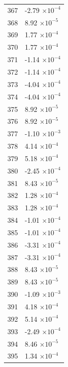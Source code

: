 \documentclass[a4paper,11pt]{article}
\begin{document}
\begin{center}
\begin{longtable}{|R{1.5cm}|R{2.5cm}|}
  367 &        -2.79 $\times 10^{          -4}$ \\
  368 &         8.92 $\times 10^{          -5}$ \\
  369 &         1.77 $\times 10^{          -4}$ \\
  370 &         1.77 $\times 10^{          -4}$ \\
  371 &        -1.14 $\times 10^{          -4}$ \\
  372 &        -1.14 $\times 10^{          -4}$ \\
  373 &        -4.04 $\times 10^{          -4}$ \\
  374 &        -4.04 $\times 10^{          -4}$ \\
  375 &         8.92 $\times 10^{          -5}$ \\
  376 &         8.92 $\times 10^{          -5}$ \\
 {\color{red} 377} & {\color{red}       -1.10 $\times 10^{          -3}$} \\
  378 &         4.14 $\times 10^{          -4}$ \\
  379 &         5.18 $\times 10^{          -4}$ \\
  380 &        -2.45 $\times 10^{          -4}$ \\
  381 &         8.43 $\times 10^{          -5}$ \\
  382 &         1.28 $\times 10^{          -4}$ \\
  383 &         1.28 $\times 10^{          -4}$ \\
  384 &        -1.01 $\times 10^{          -4}$ \\
  385 &        -1.01 $\times 10^{          -4}$ \\
  386 &        -3.31 $\times 10^{          -4}$ \\
  387 &        -3.31 $\times 10^{          -4}$ \\
  388 &         8.43 $\times 10^{          -5}$ \\
  389 &         8.43 $\times 10^{          -5}$ \\
  390 &        -1.09 $\times 10^{          -3}$ \\
  391 &         4.18 $\times 10^{          -4}$ \\
  392 &         5.14 $\times 10^{          -4}$ \\
  393 &        -2.49 $\times 10^{          -4}$ \\
  394 &         8.46 $\times 10^{          -5}$ \\
  395 &         1.34 $\times 10^{          -4}$ \\

\end{longtable}
\end{center}
\end{document}
